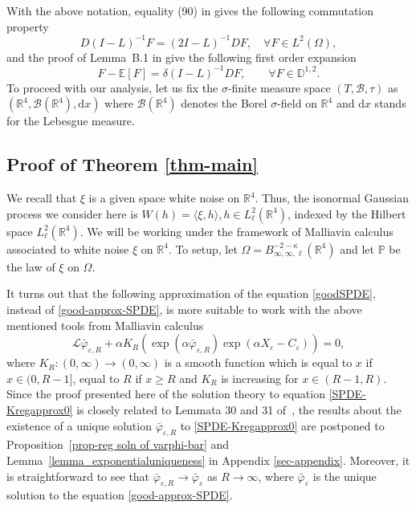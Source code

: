 \documentclass{article}
\newcommand{\mathd}{\mathrm{d}}
\begin{document}
With the above notation, equality (90) in {\cite{FG2019}} gives the following commutation property
\begin{equation}
  D (I - L)^{- 1} F = (2 I - L)^{- 1} D F, \quad \forall F \in L^2 (\Omega),
  \label{FG2019_90}
\end{equation}
and the proof of Lemma~B.1 in {\cite{FG2019}} give the following first order
expansion
\begin{equation}
  F -\mathbb{E} [F] = \delta (I - L)^{- 1} D F, \qquad \forall F \in
  \mathbb{D}^{1, 2} . \label{lemB.1}
\end{equation}
To proceed with our analysis, let us fix the $\sigma$-finite measure space
$(T, \mathcal{B}, \tau)$ as $(\mathbb{R}^4, \mathcal{B} (\mathbb{R}^4), \mathd
x)$ where $\mathcal{B} (\mathbb{R}^4)$ denotes the Borel $\sigma$-field on $\mathbb{R}^4$ and $\mathd x$ stands for the Lebesgue measure.

\subsection{Proof of Theorem \ref{thm-main}}\label{subsec-malliavin-proof}

\quad We recall that $\xi$ is a given space white noise on $\mathbb{R}^4$. Thus, the
isonormal Gaussian process we consider here is $W (h) = \langle \xi, h
\rangle, h \in L^2_{\ell} (\mathbb{R}^4)$, indexed by the Hilbert space
$L^2_{\ell} (\mathbb{R}^4) .$ We will be working under the framework of
Malliavin calculus associated to white noise $\xi$ on $\mathbb{R}^4$. To
setup, let $\Omega = B^{- 2 - \kappa}_{\infty, \infty, \ell} (\mathbb{R}^4)$
and let $\mathbb{P}$ be the law of $\xi$ on $\Omega .$

It turns out that the following approximation of the equation
\eqref{goodSPDE}, instead of \eqref{good-approx-SPDE}, is more suitable to work with the above mentioned tools from Malliavin calculus
%
\begin{equation}  \label{SPDE-Kregapprox0}
      \mathcal{L} \bar{\varphi}_{\varepsilon, R} + \alpha K_R (\exp (\alpha
      \bar{\varphi}_{\varepsilon, R}) \exp (\alpha X_{\varepsilon} -
      C_{\varepsilon})) = 0,
\end{equation}
%
where $K_R : (0, \infty) \rightarrow (0, \infty)$ is a smooth function which
is equal to $x$ if $x \in (0, R - 1]$, equal to $R$ if $x \geqslant R$ and
$K_R$ is increasing for $x \in (R - 1, R)$. Since the proof presented here of the solution theory to equation \eqref{SPDE-Kregapprox0} is closely related to Lemmata 30 and 31 of~{\cite{AVG2021}}, the results about the existence of a unique solution $\bar{\varphi}_{\varepsilon, R}$ to \eqref{SPDE-Kregapprox0} are postponed to Proposition~\ref{prop-reg soln of varphi-bar} and Lemma~\ref{lemma_exponentialuniqueness} in Appendix \ref{sec-appendix}. Moreover, it is straightforward to see that $\bar{\varphi}_{\varepsilon, R}
\rightarrow \bar{\varphi}_{\varepsilon}$ as $R \rightarrow \infty$, where
$\bar{\varphi}_{\varepsilon}$ is the unique solution to the equation
\eqref{good-approx-SPDE}.
\end{document}
